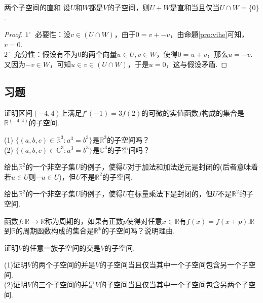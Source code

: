 \documentclass[lang=cn, zihao=5]{elegantbook}
\newcommand{\R}{\mathbb{R}}
\newcommand{\C}{\mathbb{C}}
\newcommand{\buzhou}[1]{$#1^{\circ} \ $}
\begin{document}
\begin{proposition}{两个子空间的直和}
    设$U$和$W$都是$V$的子空间，则$U+W$是直和当且仅当$U \cap W = \{ 0 \}$.
\end{proposition}
\begin{proof}
    \buzhou{1} 必要性：设$v \in (U \cap W)$，由于$0 = v + -v$，由命题\ref{pro:vihe}可知，$v = 0$. \\
    \buzhou{2} 充分性：假设有不为$0$的两个向量$u \in U,v \in W$，使得$0 = u + v$，那么$u = -v$.又因为$-v \in W$，可知$u \in v \in (U \cap W)$，于是$u=0$，这与假设矛盾.
\end{proof}

\subsection*{习题}

\begin{exercise}
	证明区间$(-4,4)$上满足$f'(-1)=3f(2)$的可微的实值函数$f$构成的集合是$\R ^{(-4,4)}$的子空间.
\end{exercise}

\begin{exercise}
	(1) $\{ (a,b,c) \in \R ^{3} : a^3 = b^3 \}$是$\R ^{3}$的子空间吗？ \\
	(2) $\{ (a,b,c) \in \C ^{3} : a^3 = b^3 \}$是$\C ^{3}$的子空间吗？
\end{exercise}

\begin{exercise}
	给出$\R ^2$的一个非空子集$U$的例子，使得$U$对于加法和加法逆元是封闭的(后者意味着若$u \in U$则$-u \in U$)，但$U$不是$\R ^2$的子空间.
\end{exercise}

\begin{exercise}
	给出$\R ^2$的一个非空子集$U$的例子，使得$U$在标量乘法下是封闭的，但$U$不是$\R ^2$的子空间.
\end{exercise}

\begin{exercise}
	函数$f : \R \to \R$称为周期的，如果有正数$p$使得对任意$x \in \R$有$f(x)=f(x+p)$.$\R$到$\R$的周期函数构成的集合是$\R ^{\R}$的子空间吗？说明理由.
\end{exercise}

\begin{exercise}
	证明$V$的任意一族子空间的交是$V$的子空间.
\end{exercise}

\begin{exercise} %
	(1)证明$V$的两个子空间的并是$V$的子空间当且仅当其中一个子空间包含另一个子空间. \\
	(2)证明$V$的三个子空间的并是$V$的子空间当且仅当其中一个子空间包含另两个子空间.
\end{exercise}
\end{document}
